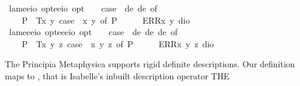 \begin{isabellebody}
\isanewline
{}\isamarkupfalse%
\ lam{}{\isacharcolon}{\isacharcolon}{\isachardoublequoteopen}{\isacharparenleft}e{\isasymRightarrow}e{\isasymRightarrow}io\ opt{\isacharparenright}{\isasymRightarrow}{\isacharparenleft}e{\isasymRightarrow}e{\isasymRightarrow}io{\isacharparenright}\ opt{\isachardoublequoteclose}{\isacharparenleft}{\isachardoublequoteopen}\isactrlbold {\isasymlambda}\ \ {\isachardoublequoteopen}\isactrlbold {\isasymlambda}\ {\isasymequiv}\ case\ {\isacharparenleft}{\isasymPhi}\ de\ de{\isacharparenright}\ of\isanewline
\ \ \ \ P{\isacharparenleft}{\isasymphi}{\isacharparenright}\ {\isasymRightarrow}\ T{\isacharparenleft}{\isasymlambda}x\ y{\isachardot}\ case\ {\isacharparenleft}{\isasymPhi}\ x\ y{\isacharparenright}\ of\ P{\isacharparenleft}{\isasymphi}{\isacharparenright}\ {\isasymRightarrow}\ {\isasymphi}{\isacharparenright}\ {\isacharbar}\ {\isacharunderscore}\ {\isasymRightarrow}\ ERR{\isacharparenleft}{\isasymlambda}x\ y{\isachardot}\ dio{\isacharparenright}{\isachardoublequoteclose}\isanewline
\isanewline
{}\isamarkupfalse%
\ lam{}{\isacharcolon}{\isacharcolon}{\isachardoublequoteopen}{\isacharparenleft}e{\isasymRightarrow}e{\isasymRightarrow}e{\isasymRightarrow}io\ opt{\isacharparenright}{\isasymRightarrow}{\isacharparenleft}e{\isasymRightarrow}e{\isasymRightarrow}e{\isasymRightarrow}io{\isacharparenright}\ opt{\isachardoublequoteclose}{\isacharparenleft}{\isachardoublequoteopen}\isactrlbold {\isasymlambda}{\isachardoublequoteclose}{\isacharparenright}\ \ {\isachardoublequoteopen}\isactrlbold {\isasymlambda}{\isasymPhi}\ {\isasymequiv}\ case\ {\isacharparenleft}{\isasymPhi}\ de\ de\ de{\isacharparenright}\ of\isanewline
\ \ \ \ P{\isacharparenleft}{\isasymphi}{\isacharparenright}\ {\isasymRightarrow}\ T{\isacharparenleft}{\isasymlambda}x\ y\ z{\isachardot}\ case\ {\isacharparenleft}{\isasymPhi}\ x\ y\ z{\isacharparenright}\ of\ P{\isacharparenleft}{\isasymphi}{\isacharparenright}\ {\isasymRightarrow}\ {\isasymphi}{\isacharparenright}\ {\isacharbar}\ {\isacharunderscore}\ {\isasymRightarrow}\ ERR{\isacharparenleft}{\isasymlambda}x\ y\ z{\isachardot}\ dio{\isacharparenright}{\isachardoublequoteclose}%
\begin{isamarkuptext}%
The Principia Metaphysica supports rigid definite descriptions. Our definition maps
  to , that is Isabelle's inbuilt description operator THE 

\end{isamarkuptext}
\end{isabellebody}
